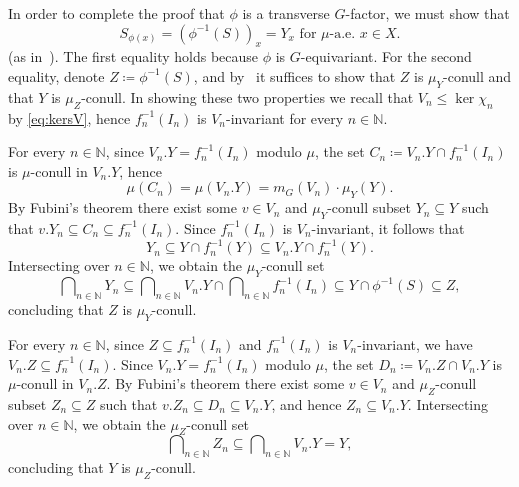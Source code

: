 \documentclass{amsart}
\numberwithin{equation}{subsection}
\theoremstyle{remark}
\begin{document}
In order to complete the proof that \(\phi\) is a transverse \(G\)-factor, we must show that
\[S_{\phi\left(x\right)}=\left(\phi^{-1}\left(S\right)\right)_{x}=Y_{x}\text{ for }\mu\text{-a.e. }x\in X.\]
(as in~\cite[Definition~5.8]{AvBjCuI}). The first equality holds because \(\phi\) is \(G\)-equivariant. For the second equality, denote \(Z\coloneqq\phi^{-1}\left(S\right)\), and by~\cite[Proposition 5.4]{AvBjCuI} it suffices to show that \(Z\) is \(\mu_{Y}\)-conull and that \(Y\) is \(\mu_{Z}\)-conull. In showing these two properties we recall that \(V_{n}\leq\ker\chi_{n}\) by \eqref{eq:kersV}, hence \(f_{n}^{-1}\left(I_{n}\right)\) is \(V_{n}\)-invariant for every \(n\in\mathbb{N}\).
\begin{description}[leftmargin=20pt, labelsep=1em]
    \item[\(\bullet\) \(Z\) is \(\mu_{Y}\)-conull] For every \(n\in\mathbb{N}\), since \(V_{n}.Y=f_{n}^{-1}\left(I_{n}\right)\) modulo \(\mu\), the set \(C_{n}\coloneqq V_{n}.Y\cap f_{n}^{-1}\left(I_{n}\right)\) is \(\mu\)-conull in \(V_{n}.Y\), hence
    \[\mu\left(C_{n}\right)=\mu\left(V_{n}.Y\right)=m_{G}\left(V_{n}\right)\cdot\mu_{Y}\left(Y\right).\]
    By Fubini's theorem there exist some \(v\in V_{n}\) and \(\mu_{Y}\)-conull subset \(Y_{n}\subseteq Y\) such that \(v.Y_{n}\subseteq C_{n}\subseteq f_{n}^{-1}\left(I_{n}\right)\). Since \(f_{n}^{-1}\left(I_{n}\right)\) is \(V_{n}\)-invariant, it follows that
    \[Y_{n}\subseteq Y\cap f_{n}^{-1}\left(Y\right)\subseteq V_{n}.Y\cap f_{n}^{-1}\left(Y\right).\]
    Intersecting over \(n\in\mathbb{N}\), we obtain the \(\mu_{Y}\)-conull set
    \[\bigcap\nolimits_{n\in\mathbb{N}}Y_{n}\subseteq\bigcap\nolimits_{n\in\mathbb{N}}V_{n}.Y\cap\bigcap\nolimits_{n\in\mathbb{N}}f_{n}^{-1}\left(I_{n}\right)\subseteq Y\cap\phi^{-1}\left(S\right)\subseteq Z,\]
    concluding that \(Z\) is \(\mu_{Y}\)-conull.
    \item[\(\bullet\) \(Y\) is \(\mu_{Z}\)-conull] For every \(n\in\mathbb{N}\), since \(Z\subseteq f_{n}^{-1}\left(I_{n}\right)\) and \(f_{n}^{-1}\left(I_{n}\right)\) is \(V_{n}\)-invariant, we have \(V_{n}.Z\subseteq f_{n}^{-1}\left(I_{n}\right)\). Since \(V_{n}.Y=f_{n}^{-1}\left(I_{n}\right)\) modulo \(\mu\), the set \(D_{n}\coloneqq V_{n}.Z\cap V_{n}.Y\) is \(\mu\)-conull in \(V_{n}.Z\). By Fubini's theorem there exist some \(v\in V_{n}\) and \(\mu_{Z}\)-conull subset \(Z_{n}\subseteq Z\) such that \(v.Z_{n}\subseteq D_{n}\subseteq V_{n}.Y\), and hence \(Z_{n}\subseteq V_{n}.Y\). Intersecting over \(n\in\mathbb{N}\), we obtain the \(\mu_{Z}\)-conull set
    \[\bigcap\nolimits_{n\in\mathbb{N}}Z_{n}\subseteq\bigcap\nolimits_{n\in\mathbb{N}}V_{n}.Y=Y,\]
    concluding that \(Y\) is \(\mu_{Z}\)-conull.
\end{description}
\end{document}
